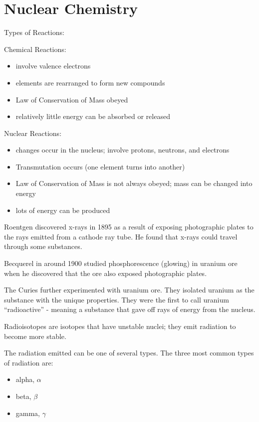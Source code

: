 \documentclass[../hchem.tex]{subfiles}
\begin{document}
\chapter{Nuclear Chemistry}
Types of Reactions:

Chemical Reactions:
\begin{itemize}
    \item involve valence electrons 
    \item elements are rearranged to form new compounds 
    \item Law of Conservation of Mass obeyed 
    \item relatively little energy can be absorbed or released
\end{itemize}

Nuclear Reactions:
\begin{itemize}
    \item changes occur in the nucleus; involve protons, neutrons, and electrons 
    \item Transmutation occurs (one element turns into another)
    \item Law of Conservation of Mass is not always obeyed; mass can be changed into energy 
    \item lots of energy can be produced 
\end{itemize}

Roentgen discovered x-rays in 1895 as a result of exposing photographic plates to the rays emitted from a cathode ray tube. He found that x-rays could travel through some substances.

Becquerel in around 1900 studied phosphorescence (glowing) in uranium ore when he discovered that the ore also exposed photographic plates.

The Curies further experimented with uranium ore. They isolated uranium as the substance with the unique properties.
They were the first to call uranium ``radioactive'' - meaning a substance that gave off rays of energy from the nucleus.

Radioisotopes are isotopes that have unstable nuclei; they emit radiation to become more stable.

The radiation emitted can be one of several types. The three most common types of radiation are:
\begin{itemize}
    \item alpha, $\alpha$
    \item beta, $\beta$
    \item gamma, $\gamma$
\end{itemize}
\end{document}
